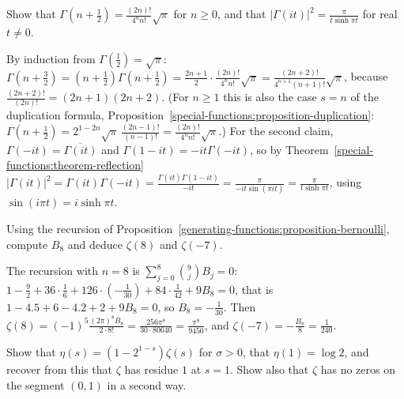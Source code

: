 \begin{exercise}\label{analytic-number-theory:exercise-gamma-values}
Show that $\Gamma(n + \frac12) = \frac{(2n)!}{4^nn!}\sqrt{\pi}$ for $n \geq 0$, and that $|\Gamma(it)|^2 = \frac{\pi}{t\sinh\pi t}$ for real $t \neq 0$.
\end{exercise}

\begin{solution}
By induction from $\Gamma(\frac12) = \sqrt\pi$: $\Gamma(n + \frac32) = (n + \frac12)\Gamma(n + \frac12) = \frac{2n + 1}{2}\cdot\frac{(2n)!}{4^nn!}\sqrt\pi = \frac{(2n + 2)!}{4^{n+1}(n + 1)!}\sqrt\pi$, because
$\frac{(2n + 2)!}{(2n)!} = (2n + 1)(2n + 2)$. (For $n \geq 1$ this is also the case $s = n$ of the duplication formula, Proposition~\ref{special-functions:proposition-duplication}:
$\Gamma(n + \frac12) = 2^{1-2n}\sqrt\pi\,\frac{(2n - 1)!}{(n - 1)!} = \frac{(2n)!}{4^nn!}\sqrt\pi$.) For the second claim, $\Gamma(-it) = \overline{\Gamma(it)}$ and $\Gamma(1 - it) = -it\Gamma(-it)$, so by
Theorem~\ref{special-functions:theorem-reflection} $|\Gamma(it)|^2 = \Gamma(it)\Gamma(-it) = \frac{\Gamma(it)\Gamma(1 - it)}{-it} = \frac{\pi}{-it\sin(\pi it)} = \frac{\pi}{t\sinh\pi t}$, using
$\sin(i\pi t) = i\sinh\pi t$.
\end{solution}

\begin{exercise}\label{analytic-number-theory:exercise-zeta-values}
Using the recursion of Proposition~\ref{generating-functions:proposition-bernoulli}, compute $B_8$ and deduce $\zeta(8)$ and $\zeta(-7)$.
\end{exercise}

\begin{solution}
The recursion with $n = 8$ is $\sum_{j=0}^8\binom9jB_j = 0$: $1 - \frac92 + 36\cdot\frac16 + 126\cdot(-\frac1{30}) + 84\cdot\frac1{42} + 9B_8 = 0$, that is $1 - 4.5 + 6 - 4.2 + 2 + 9B_8 = 0$, so $B_8 = -\frac1{30}$.
Then $\zeta(8) = (-1)^5\frac{(2\pi)^8B_8}{2 \cdot 8!} = \frac{256\pi^8}{30 \cdot 80640} = \frac{\pi^8}{9450}$, and $\zeta(-7) = -\frac{B_8}{8} = \frac1{240}$.
\end{solution}

\begin{exercise}\label{analytic-number-theory:exercise-eta}
Show that $\eta(s) = (1 - 2^{1-s})\zeta(s)$ for $\sigma > 0$, that $\eta(1) = \log 2$, and recover from this that $\zeta$ has residue $1$ at $s = 1$. Show also that $\zeta$ has no zeros on the segment
$(0, 1)$ in a second way.
\end{exercise}

